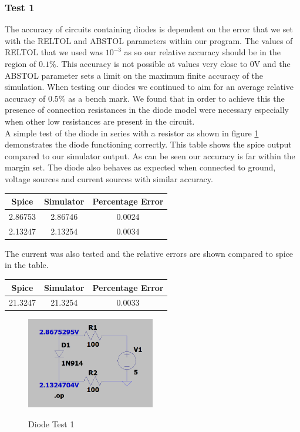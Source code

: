 \documentclass{article}
\begin{document}
\subsubsection{Test 1}
The accuracy of circuits containing diodes is dependent on the error that we set with the RELTOL and ABSTOL parameters within our program. The values of RELTOL that we used was $10^{-3}$ as so our relative accuracy should be in the region of $0.1\%$. This accuracy is not possible at values very close to 0V and the ABSTOL parameter sets a limit on the maximum finite accuracy of the simulation. When testing our diodes we continued to aim for an average relative accuracy of $0.5\%$ as a bench mark. We found that in order to achieve this the presence of connection resistances in the diode model were necessary especially when other low resistances are present in the circuit. \\
A simple test of the diode in series with a resistor as shown in figure \ref{fig:DiodeTest1} demonstrates the diode functioning correctly. This table shows the spice output compared to our simulator output. As can be seen our accuracy is far within the margin set. The diode also behaves as expected when connected to ground, voltage sources and current sources with similar accuracy.  
\begin{center}
\begin{tabular}{ ||c| c ||c ||}
\hline
 Spice & Simulator & Percentage Error \\ 
 \hline
 2.86753 & 2.86746 & 0.0024 \\  
 2.13247 & 2.13254 & 0.0034 \\   
 \hline
\end{tabular}
\end{center}
The current was also tested and the relative errors are shown compared to spice in the table.
\begin{center}
\begin{tabular}{ ||c| c ||c ||}
\hline
 Spice & Simulator & Percentage Error \\ 
 \hline
 21.3247 & 21.3254 & 0.0033 \\  
 \hline
\end{tabular}
\end{center}
\begin{figure}[h]
    \caption{Diode Test 1}
    \centering
    \includegraphics[width=0.5\textwidth]{images/DiodeTest1.png}
    \label{fig:DiodeTest1}
\end{figure}
\newpage
\end{document}
